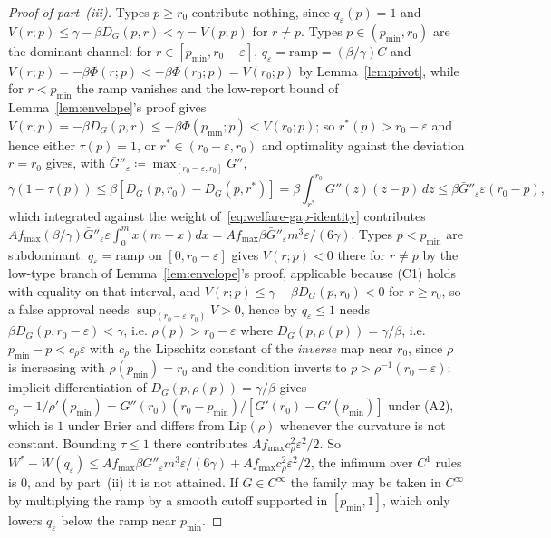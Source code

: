 \documentclass[acmsmall,nonacm,screen]{acmart}
\theoremstyle{acmplain}%
\theoremstyle{acmdefinition}%
\numberwithin{equation}{section}
\begin{document}
\begin{appendix}
\begin{proof}[Proof of part~(iii)]
Types $p\geq r_0$ contribute nothing, since $q_\varepsilon(p)=1$ and $V(r;p)\leq\gamma-\beta D_G(p,r)<\gamma=V(p;p)$ for $r\neq p$. Types $p\in(p_{\min},r_0)$ are the dominant channel: for $r\in[p_{\min},r_0-\varepsilon]$, $q_\varepsilon=\mathrm{ramp}=(\beta/\gamma)C$ and $V(r;p)=-\beta\Phi(r;p)<-\beta\Phi(r_0;p)=V(r_0;p)$ by Lemma~\ref{lem:pivot}, while for $r<p_{\min}$ the ramp vanishes and the low-report bound of Lemma~\ref{lem:envelope}'s proof gives $V(r;p)=-\beta D_G(p,r)\leq-\beta\Phi(p_{\min};p)<V(r_0;p)$; so $r^*(p)>r_0-\varepsilon$ and hence either $\tau(p)=1$, or $r^*\in(r_0-\varepsilon,r_0)$ and optimality against the deviation $r=r_0$ gives, with $\bar G''_\varepsilon\coloneqq\max_{[r_0-\varepsilon,r_0]}G''$,
\[
\gamma(1-\tau(p))\leq\beta[D_G(p,r_0)-D_G(p,r^*)]=\beta\!\int_{r^*}^{r_0}\!G''(z)(z-p)\,dz\leq\beta\bar G''_\varepsilon\varepsilon(r_0-p),
\]
which integrated against the weight of~\eqref{eq:welfare-gap-identity} contributes $Af_{\max}(\beta/\gamma)\bar G''_\varepsilon\varepsilon\int_0^mx(m-x)dx=Af_{\max}\beta\bar G''_\varepsilon m^3\varepsilon/(6\gamma)$. Types $p<p_{\min}$ are subdominant: $q_\varepsilon=\mathrm{ramp}$ on $[0,r_0-\varepsilon]$ gives $V(r;p)<0$ there for $r\neq p$ by the low-type branch of Lemma~\ref{lem:envelope}'s proof, applicable because (C1) holds with equality on that interval, and $V(r;p)\leq\gamma-\beta D_G(p,r_0)<0$ for $r\geq r_0$, so a false approval needs $\sup_{(r_0-\varepsilon,r_0)}V>0$, hence by $q_\varepsilon\leq1$ needs $\beta D_G(p,r_0-\varepsilon)<\gamma$, i.e. $\rho(p)>r_0-\varepsilon$ where $D_G(p,\rho(p))=\gamma/\beta$, i.e. $p_{\min}-p<c_\rho\varepsilon$ with $c_\rho$ the Lipschitz constant of the \emph{inverse} map near $r_0$, since $\rho$ is increasing with $\rho(p_{\min})=r_0$ and the condition inverts to $p>\rho^{-1}(r_0-\varepsilon)$; implicit differentiation of $D_G(p,\rho(p))=\gamma/\beta$ gives $c_\rho=1/\rho'(p_{\min})=G''(r_0)(r_0-p_{\min})/[G'(r_0)-G'(p_{\min})]$ under (A2), which is $1$ under Brier and differs from $\mathrm{Lip}(\rho)$ whenever the curvature is not constant. Bounding $\tau\leq1$ there contributes $Af_{\max}c_\rho^2\varepsilon^2/2$. So $W^*-W(q_\varepsilon)\leq Af_{\max}\beta\bar G''_\varepsilon m^3\varepsilon/(6\gamma)+Af_{\max}c_\rho^2\varepsilon^2/2$, the infimum over $C^1$ rules is $0$, and by part~(ii) it is not attained. If $G\in C^\infty$ the family may be taken in $C^\infty$ by multiplying the ramp by a smooth cutoff supported in $[p_{\min},1]$, which only lowers $q_\varepsilon$ below the ramp near $p_{\min}$.
\end{proof}



\end{appendix}
\end{document}
